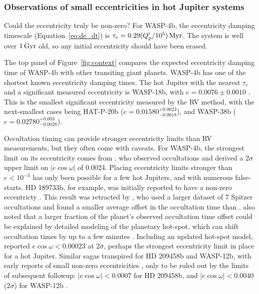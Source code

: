 \documentclass[12pt,twocolumn,tighten]{aastex62}
\begin{document}
\subsubsection{Observations of small eccentricities in hot
Jupiter systems}

Could the eccentricity truly be non-zero?  For WASP-4b, the
eccentricity damping timescale (Equation~\ref{eq:de_dt}) is $\tau_e =
0.29 (Q_{\rm p}'/10^5) \, {\rm Myr}$.  The system is well over
$1\,{\rm Gyr}$ \citep{winn_transit_2009} old, so any initial
eccentricity should have been erased.

The top panel of Figure~\ref{fig:context} compares the expected
eccentricity damping time of WASP-4b with other transiting giant
planets.  WASP-4b has one of the shortest known eccentricity damping
times.  The hot Jupiter with the nearest $\tau_e$ and a significant
measured eccentricity is WASP-18b, with $e = 0.0076 \pm 0.0010$
\citep{triaud_spin-orbit_2010,bonomo_gaps_2017}.  This is the smallest
significant eccentricity measured by the RV method, with the
next-smallest cases being HAT-P-20b ($e =
0.01580^{+0.0023}_{-0.0018}$), and WASP-38b ($e =
0.02780^{+0.003}_{-0.0028}$).

Occultation timing can provide stronger eccentricity limits than RV
measurements, but they often come with caveats.  For WASP-4b, the
strongest limit on its eccentricity comes from
\citet{beerer_secondary_2011}, who observed occultations and derived a
$2\sigma$ upper limit on $| e\cos\omega | $ of 0.0024.
Placing eccentricity limits stronger than $e< 10^{-3}$ has only been
possible for a few hot Jupiters, and with numerous false-starts.
HD 189733b, for example, was initially reported to have a non-zero
eccentricty
\citep{knutson_map_2007}.  This result was retracted by
\citet{agol_climate_2010}, who used a larger dataset of 7 Spitzer
occultations and found a smaller average offset in the occultation
time than \citet{knutson_map_2007}.  \citet{agol_climate_2010} also
noted that a larger fraction of the planet's observed occultation time
offset could be explained by detailed modeling of the planetary
hot-spot, which can shift occultation times by up to a few minutes
\citep{williams_resolving_2006}.  Including an updated hot-spot model,
\citet{agol_climate_2010} reported $e\cos\omega < 0.00023$ at
2$\sigma$, perhaps the strongest eccentricity limit in place for a hot
Jupiter.  Similar sagas transpired for HD 209458b and WASP-12b, with
early reports of small non-zero eccentricities
\citep{winn_measurement_2005,hebb_wasp-12b_2009,lopez-morales_day-side_2010},
only to be ruled out by the limits of subsequent followup:
$|e\cos\omega| < 0.0007$ for HD 209458b, and $| e\cos\omega| < 0.0040$
($2\sigma$) for WASP-12b
\citep{crossfield_spitzer_mips_2012,campo_orbit_2011,croll_near-infrared_2011}.
\end{document}
